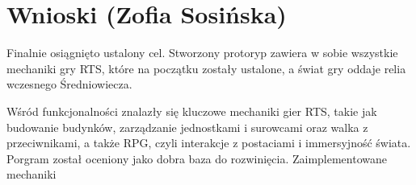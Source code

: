 \section{Wnioski (Zofia Sosińska)}
Finalnie osiągnięto ustalony cel. Stworzony protoryp zawiera w sobie wszystkie mechaniki gry RTS,
które na początku zostały ustalone, a świat gry oddaje relia wczesnego Średniowiecza. 

Wśród funkcjonalności znalazły się kluczowe mechaniki gier RTS, takie jak budowanie budynków, zarządzanie
jednostkami i surowcami oraz walka z przeciwnikami, a także RPG, czyli interakcje z postaciami i immersyjność
świata. Porgram został oceniony jako dobra baza do rozwinięcia. Zaimplementowane mechaniki 